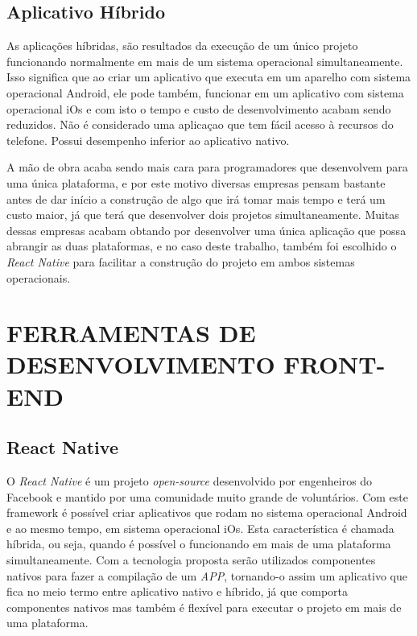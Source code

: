 \subsection{Aplicativo Híbrido}
As aplicações híbridas, são resultados da execução de um único projeto funcionando normalmente em mais de um sistema operacional simultaneamente. Isso significa que ao criar um aplicativo que executa em um aparelho com sistema operacional Android, ele pode também, funcionar em um aplicativo com sistema operacional iOs e com isto o tempo e custo de desenvolvimento acabam sendo reduzidos. Não é considerado uma aplicaçao que tem fácil acesso à recursos do telefone. Possui desempenho inferior ao aplicativo nativo.

A mão de obra acaba sendo mais cara para programadores que desenvolvem para uma única plataforma, e por este motivo diversas empresas pensam bastante antes de dar início a construção de algo que irá tomar mais tempo e terá um custo maior, já que terá que desenvolver dois projetos simultaneamente. Muitas dessas empresas acabam obtando por desenvolver uma única aplicação que possa abrangir as duas plataformas, e no caso deste trabalho, também foi escolhido o \textit{React Native} para facilitar a construção do projeto em ambos sistemas operacionais. 




\section{FERRAMENTAS DE DESENVOLVIMENTO FRONT-END}

\subsection{React Native}

O \textit{React Native} é um projeto \textit{open-source} desenvolvido por engenheiros do Facebook e mantido por uma comunidade muito grande de voluntários. Com este framework é possível criar aplicativos que rodam no sistema operacional Android e ao mesmo tempo, em sistema operacional iOs. Esta característica é chamada híbrida, ou seja, quando é possível o funcionando em mais de uma plataforma simultaneamente. Com a tecnologia proposta serão utilizados componentes nativos para fazer a compilação de um \textit{APP}, tornando-o assim um aplicativo que fica no meio termo entre aplicativo nativo e híbrido, já que comporta componentes nativos mas também é flexível para executar o projeto em mais de uma plataforma.

